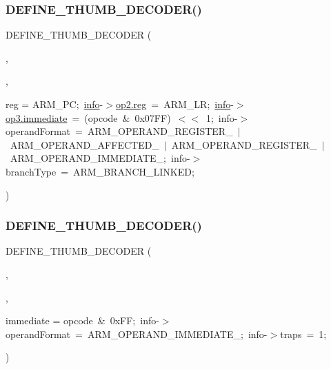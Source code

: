 \subsubsection{\texorpdfstring{D\+E\+F\+I\+N\+E\+\_\+\+T\+H\+U\+M\+B\+\_\+\+D\+E\+C\+O\+D\+E\+R()}{DEFINE\_THUMB\_DECODER()}\hspace{0.1cm}{\footnotesize\ttfamily [3/4]}}
{\footnotesize\ttfamily D\+E\+F\+I\+N\+E\+\_\+\+T\+H\+U\+M\+B\+\_\+\+D\+E\+C\+O\+D\+ER (\begin{DoxyParamCaption}\item[{B\+L2}]{,  }\item[{\mbox{\hyperlink{decoder-thumb_8c_adafdf5f045e21581219028370836474d}{BL}}}]{,  }\item[{\mbox{\hyperlink{libretro_8h_a283ad41e4809f9c0ebe736a9861d8a91}{info}}-\/$>$op1.}]{reg = {\ttfamily ARM\+\_\+PC;~\mbox{\hyperlink{libretro_8h_a283ad41e4809f9c0ebe736a9861d8a91}{info}}-\/$>$\mbox{\hyperlink{lr35902_2decoder_8c_af44c02f7785479603f59b662f3dfae6a}{op2.\+reg}}~=~ARM\+\_\+LR;~\mbox{\hyperlink{libretro_8h_a283ad41e4809f9c0ebe736a9861d8a91}{info}}-\/$>$\mbox{\hyperlink{lr35902_2decoder_8c_a8bc2501cb64b3bc9ac59754cfafb68d1}{op3.\+immediate}}~=~(opcode~\&~0x07FF)~$<$$<$~1;~info-\/$>$operandFormat~=~ARM\+\_\+OPERAND\+\_\+REGISTER\+\_~$\vert$~ARM\+\_\+OPERAND\+\_\+AFFECTED\+\_~$\vert$~ARM\+\_\+OPERAND\+\_\+REGISTER\+\_~$\vert$~ARM\+\_\+OPERAND\+\_\+IMMEDIATE\+\_;~info-\/$>$branchType~=~ARM\+\_\+BRANCH\+\_\+LINKED;} }\end{DoxyParamCaption})}

\mbox{\label{decoder-thumb_8c_a84abeab37fbe3346022b0183435c32e9}} 
\subsubsection{\texorpdfstring{D\+E\+F\+I\+N\+E\+\_\+\+T\+H\+U\+M\+B\+\_\+\+D\+E\+C\+O\+D\+E\+R()}{DEFINE\_THUMB\_DECODER()}\hspace{0.1cm}{\footnotesize\ttfamily [4/4]}}
{\footnotesize\ttfamily D\+E\+F\+I\+N\+E\+\_\+\+T\+H\+U\+M\+B\+\_\+\+D\+E\+C\+O\+D\+ER (\begin{DoxyParamCaption}\item[{\mbox{\hyperlink{decoder-arm_8c_a7141da859cbdc269afb6e05ab70fd0bc}{S\+WI}}}]{,  }\item[{\mbox{\hyperlink{decoder-arm_8c_a7141da859cbdc269afb6e05ab70fd0bc}{S\+WI}}}]{,  }\item[{\mbox{\hyperlink{libretro_8h_a283ad41e4809f9c0ebe736a9861d8a91}{info}}-\/$>$op1.}]{immediate = {\ttfamily opcode~\&~0xFF;~info-\/$>$operandFormat~=~ARM\+\_\+OPERAND\+\_\+IMMEDIATE\+\_;~info-\/$>$traps~=~1;} }\end{DoxyParamCaption})}



